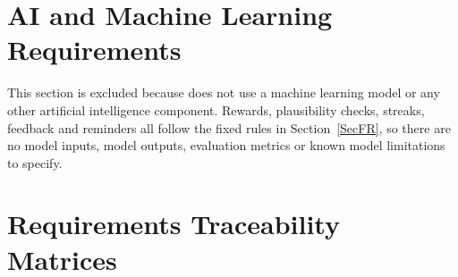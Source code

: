 \documentclass[12pt]{article}
\begin{document}
\section{AI and Machine Learning Requirements}

This section is excluded because \progname{} does not use a machine learning
model or any other artificial intelligence component. Rewards, plausibility
checks, streaks, feedback and reminders all follow the fixed rules in
Section~\ref{SecFR}, so there are no model inputs, model outputs, evaluation
metrics or known model limitations to specify.


\section{Requirements Traceability Matrices}

\end{document}
